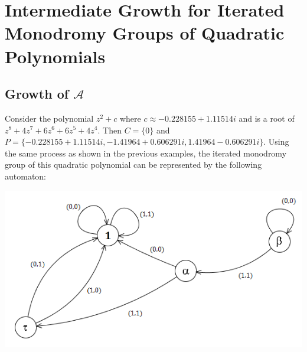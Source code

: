 \documentclass[11pt]{amsart}
\theoremstyle{definition}
\theoremstyle{remark}
\numberwithin{equation}{section}
\begin{document}
\section{Intermediate Growth for Iterated Monodromy Groups of Quadratic Polynomials}

\subsection{Growth of $\mathcal{A}$}
Consider the polynomial $z^2 + c$ where $c \approx -0.228155 + 1.11514i$ and is a root of $z^8 + 4z^7 + 6z^6 + 6z^5 + 4z^4$. Then $C = \{0\}$ and $P = \{-0.228155 + 1.11514i,-1.41964 + 0.606291i,1.41964 - 0.606291i\}$. Using the same process as shown in the previous examples, the iterated monodromy group of this quadratic polynomial can be represented by the following automaton:\\

\begin{center}
\includegraphics{groupAauto.png}
\end{center}
\end{document}

